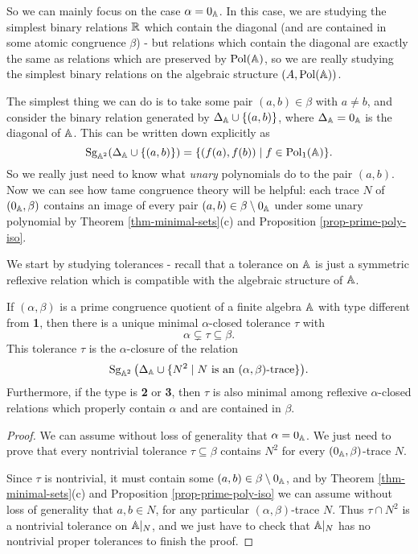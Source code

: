 \begin{appendices}
So we can mainly focus on the case $\alpha = 0_{\mathbb{A}}$. In this case, we are studying the simplest binary relations $\mathbb{R}$ which contain the diagonal (and are contained in some atomic congruence $\beta$) - but relations which contain the diagonal are exactly the same as relations which are preserved by $\operatorname{Pol}(\mathbb{A})$, so we are really studying the simplest binary relations on the algebraic structure $(A,\operatorname{Pol}(\mathbb{A}))$.

The simplest thing we can do is to take some pair $(a,b) \in \beta$ with $a \ne b$, and consider the binary relation generated by $\Delta_{\mathbb{A}} \cup \{(a,b)\}$, where $\Delta_{\mathbb{A}} = 0_{\mathbb{A}}$ is the diagonal of $\mathbb{A}$. This can be written down explicitly as
\[
\operatorname{Sg}_{\mathbb{A}^2}(\Delta_{\mathbb{A}} \cup \{(a,b)\}) = \{(f(a),f(b)) \mid f \in \operatorname{Pol}_1(\mathbb{A})\}.
\]
So we really just need to know what \emph{unary} polynomials do to the pair $(a,b)$. Now we can see how tame congruence theory will be helpful: each trace $N$ of $(0_{\mathbb{A}}, \beta)$ contains an image of every pair $(a,b) \in \beta \setminus 0_{\mathbb{A}}$ under some unary polynomial by Theorem \ref{thm-minimal-sets}(c) and Proposition \ref{prop-prime-poly-iso}.

We start by studying tolerances - recall that a tolerance on $\mathbb{A}$ is just a symmetric reflexive relation which is compatible with the algebraic structure of $\mathbb{A}$.

\begin{thm}\label{thm-basic-tolerance} If $(\alpha,\beta)$ is a prime congruence quotient of a finite algebra $\mathbb{A}$ with type different from \textbf{1}, then there is a unique minimal $\alpha$-closed tolerance $\tau$ with
\[
\alpha \subsetneq \tau \subseteq \beta.
\]
This tolerance $\tau$ is the $\alpha$-closure of the relation
\[
\operatorname{Sg}_{\mathbb{A}^2}\big(\Delta_{\mathbb{A}} \cup \{N^2 \mid N \text{ is an $(\alpha,\beta)$-trace}\}\big).
\]
Furthermore, if the type is \textbf{2} or \textbf{3}, then $\tau$ is also minimal among reflexive $\alpha$-closed relations which properly contain $\alpha$ and are contained in $\beta$.
\end{thm}
\begin{proof} We can assume without loss of generality that $\alpha = 0_{\mathbb{A}}$. We just need to prove that every nontrivial tolerance $\tau \subseteq \beta$ contains $N^2$ for every $(0_{\mathbb{A}},\beta)$-trace $N$.

Since $\tau$ is nontrivial, it must contain some $(a,b) \in \beta\setminus 0_{\mathbb{A}}$, and by Theorem \ref{thm-minimal-sets}(c) and Proposition \ref{prop-prime-poly-iso} we can assume without loss of generality that $a,b \in N$, for any particular $(\alpha,\beta)$-trace $N$. Thus $\tau \cap N^2$ is a nontrivial tolerance on $\mathbb{A}|_N$, and we just have to check that $\mathbb{A}|_N$ has no nontrivial proper tolerances to finish the proof.


\end{proof}
\end{appendices}
